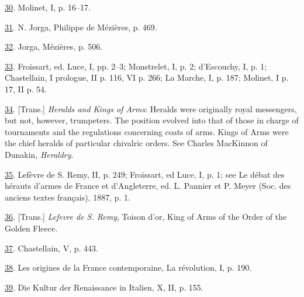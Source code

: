\protect\hypertarget{23_NOTES.xhtmlux5cux23id_1873}{\protect\hyperlink{10_Chapter_Three__THE_HEROIC_DREAM.xhtmlux5cux23id_1872}{30}}.
Molinet, I, p. 16--17.

\protect\hypertarget{23_NOTES.xhtmlux5cux23id_1871}{\protect\hyperlink{10_Chapter_Three__THE_HEROIC_DREAM.xhtmlux5cux23id_1870}{31}}.
N. Jorga, Philippe de Mézières, p. 469.

\protect\hypertarget{23_NOTES.xhtmlux5cux23id_1869}{\protect\hyperlink{10_Chapter_Three__THE_HEROIC_DREAM.xhtmlux5cux23id_1868}{32}}.
Jorga, Mézières, p. 506.

\protect\hypertarget{23_NOTES.xhtmlux5cux23id_1867}{\protect\hyperlink{10_Chapter_Three__THE_HEROIC_DREAM.xhtmlux5cux23id_1866}{33}}.
Froissart, ed. Luce, I, pp. 2--3; Monstrelet, I, p. 2; d'Escouchy, I, p.
1; Chastellain, I prologue, II p. 116, VI p. 266; La Marche, I, p. 187;
Molinet, I p. 17, II p. 54.

\protect\hypertarget{23_NOTES.xhtmlux5cux23id_1865}{\protect\hyperlink{10_Chapter_Three__THE_HEROIC_DREAM.xhtmlux5cux23id_1864}{34}}.
{[}Trans.{]} \emph{Heralds and Kings of Arms}: Heralds were originally
royal messengers, but not, however, trumpeters. The position evolved
into that of those in charge of tournaments and the regulations
concerning coats of arms. Kings of Arms were the chief heralds of
particular chivalric orders. See Charles MacKinnon of Dunakin,
\emph{Heraldry}.

\protect\hypertarget{23_NOTES.xhtmlux5cux23page_406}{\protect\hyperlink{10_Chapter_Three__THE_HEROIC_DREAM.xhtmlux5cux23id_1863}{35}}.
Lefèvre de S. Remy, II, p. 249; Froissart, ed Luce, I, p. 1; see Le
débat des hérauts d'armes de France et d'Angleterre, ed. L. Pannier et
P. Meyer (Soc. des anciens textes français), 1887, p. 1.

\protect\hypertarget{23_NOTES.xhtmlux5cux23id_1862}{\protect\hyperlink{10_Chapter_Three__THE_HEROIC_DREAM.xhtmlux5cux23id_1861}{36}}.
{[}Trans.{]} \emph{Lefevre de S. Remy}, Toison d'or, King of Arms of the
Order of the Golden Fleece.

\protect\hypertarget{23_NOTES.xhtmlux5cux23id_1860}{\protect\hyperlink{10_Chapter_Three__THE_HEROIC_DREAM.xhtmlux5cux23id_1859}{37}}.
Chastellain, V, p. 443.

\protect\hypertarget{23_NOTES.xhtmlux5cux23id_1858}{\protect\hyperlink{10_Chapter_Three__THE_HEROIC_DREAM.xhtmlux5cux23id_1857}{38}}.
Les origines de la France contemporaine, La révolution, I, p. 190.

\protect\hypertarget{23_NOTES.xhtmlux5cux23id_1856}{\protect\hyperlink{10_Chapter_Three__THE_HEROIC_DREAM.xhtmlux5cux23id_1855}{39}}.
Die Kultur der Renaissance in Italien, X, II, p. 155.


